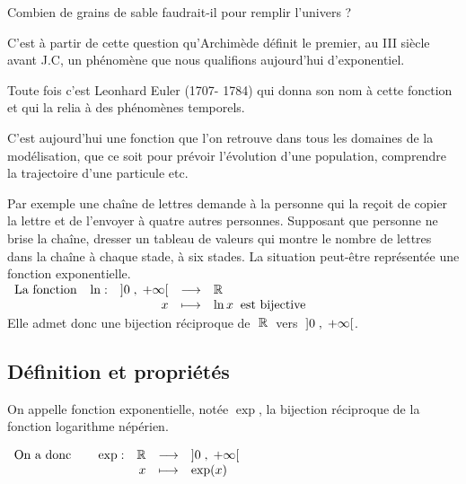 


  
Combien de grains de sable faudrait-il pour remplir l'univers ?

C'est à partir de cette question qu'Archimède définit le premier, au III siècle avant J.C, un phénomène que nous qualifions aujourd'hui  d'exponentiel.

Toute fois c'est Leonhard Euler  (1707- 1784)  qui donna son nom à cette fonction et qui la relia à des phénomènes temporels.


C'est aujourd'hui  une fonction que l'on retrouve dans tous les domaines de la modélisation, que ce soit pour prévoir l'évolution d'une population, comprendre la trajectoire d'une particule etc.

Par exemple une chaîne de lettres demande à la personne qui la reçoit de copier la lettre et de l'envoyer à quatre autres personnes. Supposant que personne ne brise la chaîne, dresser un tableau de valeurs qui montre le nombre de lettres dans la chaîne à chaque stade, à six stades. La situation  peut-être  représentée une fonction exponentielle. \\


 $  \begin{array}{lrcl}
 \text{La fonction }\;\;  \ln  : & \intoo{0}{\pinf}  &   \longrightarrow &  \Rr \\ 
  &  x & \longmapsto & \ln x \; \; \text{est bijective}
  
 \end{array}$ \\
 Elle admet donc  une bijection  réciproque  de  $\; \Rr \;$  vers $\;  \intoo{0}{\pinf} $.
 
 
\subsection{Définition et propriétés}


\begin{definition}
 On appelle fonction exponentielle,  notée $ \exp$,  la bijection réciproque de la fonction logarithme népérien.
\end{definition}

\begin{center}

   $  \begin{array}{lrcl}
 \text{On a donc}\qquad \exp  : & \mathbb{R}  &   \longrightarrow &  \left]0 \;,\; +\infty\right[ \\ 
  &  x & \longmapsto & \exp(x)  \end{array} $ 
\end{center}

